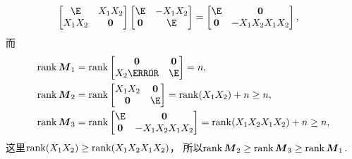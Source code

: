 \begin{example}
\begin{solution}
\begin{align*}
\begin{bmatrix}
		\E & \A \B \\
		\A \B & \vb0
	\end{bmatrix}
	\begin{bmatrix}
		\E & -\A \B \\
		\vb0 & \E
	\end{bmatrix}
	&= \begin{bmatrix}
		\E & \vb0 \\
		\vb0 & -\A \B \A \B
	\end{bmatrix},
\end{align*}
而\begin{align*}
	\rank\M_1
	&= \rank\begin{bmatrix}
		\vb0 & \vb0 \\
		\B \C & \E
	\end{bmatrix}
	= n, \\
	\rank\M_2
	&= \rank\begin{bmatrix}
		\A \B & \vb0 \\
		\vb0 & \E
	\end{bmatrix}
	= \rank(\A\B) + n
	\geq n, \\
	\rank\M_3
	&= \rank\begin{bmatrix}
		\E & \vb0 \\
		\vb0 & -\A \B \A \B
	\end{bmatrix}
	= \rank(\A \B \A \B) + n
	\geq n,
\end{align*}
这里\(\rank(X_1 X_2) \geq \rank(X_1 X_2 X_1 X_2)\)，
所以\(\rank\boldsymbol{M}_2 \geq \rank\boldsymbol{M}_3 \geq \rank\boldsymbol{M}_1\).
\end{solution}
\end{example}
